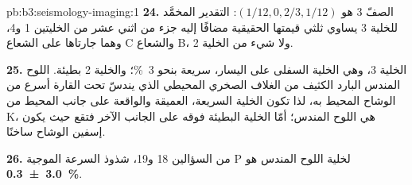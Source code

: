 \begin{solution}{pb:b3:seismology-imaging:1}
 \textbf{24.} الصفّ 3 هو $(1/12, 0, 2/3, 1/12)$: التقدير المخمَّد للخلية 3 يساوي
ثلثي قيمتها الحقيقية مضافًا إليه جزء من اثني عشر من الخليتين 1 و4، وهما جارتاها
على الشعاع C والشعاع B، ولا شيء من الخلية 2.

 \textbf{25.} الخلية 3، وهي الخلية السفلى على اليسار، سريعة بنحو
\qty{3}{\percent}؛ والخلية 2 بطيئة. اللوح المندس البارد الكثيف من الغلاف الصخري المحيطي
الذي يندسّ تحت القارة أسرع من الوشاح المحيط به، لذا تكون الخلية
السريعة، العميقة والواقعة على جانب المحيط من K، هي اللوح المندس؛ أمّا الخلية البطيئة فوقه
على الجانب الآخر فتقع حيث يكون إسفين الوشاح ساخنًا.

 \textbf{26.} من السؤالين 18 و19، شذوذ السرعة الموجية P لخلية اللوح المندس هو
\textbf{\qty[text-series-to-math=true, uncertainty-mode=separate]{3.0 \pm 0.3}{\percent}}.
\end{solution}
